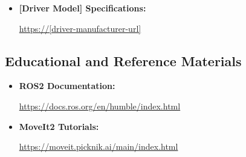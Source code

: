 \begin{appendices}
\begin{itemize}
    \item \textbf{[Driver Model] Specifications:}\par
    \label{link:driver_datasheet}
    \url{https://[driver-manufacturer-url]}
\end{itemize}

\subsection*{Educational and Reference Materials}
\begin{itemize}
    \item \textbf{ROS2 Documentation:}\par
    \label{link:ros2_docs}
    \url{https://docs.ros.org/en/humble/index.html}

    \item \textbf{MoveIt2 Tutorials:}\par
    \label{link:moveit2_tutorials}
    \url{https://moveit.picknik.ai/main/index.html}
\end{itemize}

\end{appendices}\par

